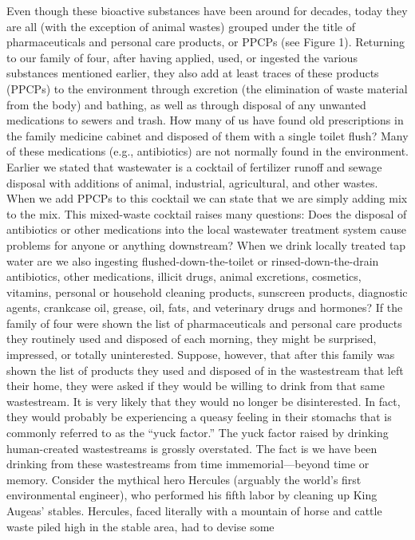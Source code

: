\documentclass{article}
\begin{document}
Even though these bioactive substances have been around for decades,
today they are all (with the exception of animal wastes) grouped under
the title of pharmaceuticals and personal care products, or PPCPs (see
Figure 1). Returning to our family of four, after having applied, used,
or ingested the various substances mentioned earlier, they also add at
least traces of these products (PPCPs) to the environment through
excretion (the elimination of waste material from the body) and bathing,
as well as through disposal of any unwanted medications to sewers and
trash. How many of us have found old prescriptions in the family
medicine cabinet and disposed of them with a single toilet flush? Many
of these medications (e.g., antibiotics) are not normally found in the
environment. Earlier we stated that wastewater is a cocktail of
fertilizer runoff and sewage disposal with additions of animal,
industrial, agricultural, and other wastes. When we add PPCPs to this
cocktail we can state that we are simply adding mix to the mix. This
mixed-waste cocktail raises many questions: Does the disposal of
antibiotics or other medications into the local wastewater treatment
system cause problems for anyone or anything downstream? When we drink
locally treated tap water are we also ingesting flushed-down-the-toilet
or rinsed-down-the-drain antibiotics, other medications, illicit drugs,
animal excretions, cosmetics, vitamins, personal or household cleaning
products, sunscreen products, diagnostic agents, crankcase oil, grease,
oil, fats, and veterinary drugs and hormones? If the family of four were
shown the list of pharmaceuticals and personal care products they
routinely used and disposed of each morning, they might be surprised,
impressed, or totally uninterested. Suppose, however, that after this
family was shown the list of products they used and disposed of in the
wastestream that left their home, they were asked if they would be
willing to drink from that same wastestream. It is very likely that they
would no longer be disinterested. In fact, they would probably be
experiencing a queasy feeling in their stomachs that is commonly
referred to as the ``yuck factor.'' The yuck factor raised by drinking
human-created wastestreams is grossly overstated. The fact is we have
been drinking from these wastestreams from time immemorial---beyond time
or memory. Consider the mythical hero Hercules (arguably the world's
first environmental engineer), who performed his fifth labor by cleaning
up King Augeas' stables. Hercules, faced literally with a mountain of
horse and cattle waste piled high in the stable area, had to devise some
\end{document}
